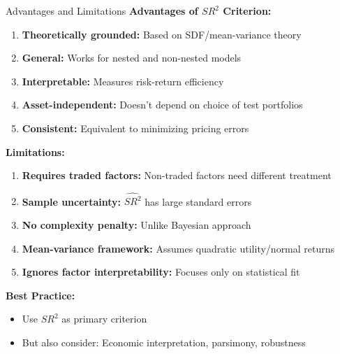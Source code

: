\documentclass{beamer}
\begin{document}
\begin{frame}{Advantages and Limitations}
    \textbf{Advantages of $SR^2$ Criterion:}
    
    
    \begin{enumerate}
        \item \textbf{Theoretically grounded:} Based on SDF/mean-variance theory
        \item \textbf{General:} Works for nested and non-nested models
        \item \textbf{Interpretable:} Measures risk-return efficiency
        \item \textbf{Asset-independent:} Doesn't depend on choice of test portfolios
        \item \textbf{Consistent:} Equivalent to minimizing pricing errors
    \end{enumerate}
    
    \vspace{0.3cm}
    \textbf{Limitations:}
    
    
    \begin{enumerate}
        \item \textbf{Requires traded factors:} Non-traded factors need different treatment
        \item \textbf{Sample uncertainty:} $\widehat{SR^2}$ has large standard errors
        \item \textbf{No complexity penalty:} Unlike Bayesian approach
        \item \textbf{Mean-variance framework:} Assumes quadratic utility/normal returns
        \item \textbf{Ignores factor interpretability:} Focuses only on statistical fit
    \end{enumerate}
    
    
    \textbf{Best Practice:}
    \begin{itemize}
        \item Use $SR^2$ as primary criterion
        \item But also consider: Economic interpretation, parsimony, robustness
    \end{itemize}
\end{frame}
\end{document}
